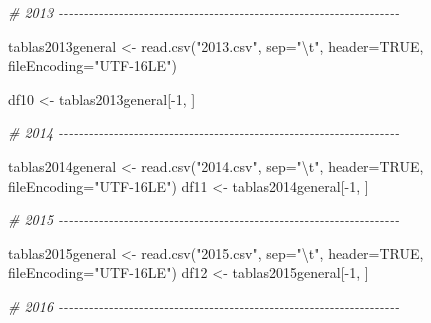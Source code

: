 \documentclass[
]{article}
\newenvironment{Shaded}{\begin{snugshade}}{\end{snugshade}}
\newcommand{\AttributeTok}[1]{\textcolor[rgb]{0.77,0.63,0.00}{#1}}
\newcommand{\CommentTok}[1]{\textcolor[rgb]{0.56,0.35,0.01}{\textit{#1}}}
\newcommand{\ConstantTok}[1]{\textcolor[rgb]{0.00,0.00,0.00}{#1}}
\newcommand{\DecValTok}[1]{\textcolor[rgb]{0.00,0.00,0.81}{#1}}
\newcommand{\FunctionTok}[1]{\textcolor[rgb]{0.00,0.00,0.00}{#1}}
\newcommand{\NormalTok}[1]{#1}
\newcommand{\OtherTok}[1]{\textcolor[rgb]{0.56,0.35,0.01}{#1}}
\newcommand{\SpecialCharTok}[1]{\textcolor[rgb]{0.00,0.00,0.00}{#1}}
\newcommand{\StringTok}[1]{\textcolor[rgb]{0.31,0.60,0.02}{#1}}
\begin{document}
\begin{Shaded}
\begin{Highlighting}[]
\CommentTok{\# 2013 {-}{-}{-}{-}{-}{-}{-}{-}{-}{-}{-}{-}{-}{-}{-}{-}{-}{-}{-}{-}{-}{-}{-}{-}{-}{-}{-}{-}{-}{-}{-}{-}{-}{-}{-}{-}{-}{-}{-}{-}{-}{-}{-}{-}{-}{-}{-}{-}{-}{-}{-}{-}{-}{-}{-}{-}{-}{-}{-}{-}{-}{-}{-}{-}{-}{-}{-}{-}}

\NormalTok{tablas2013general }\OtherTok{\textless{}{-}} \FunctionTok{read.csv}\NormalTok{(}\StringTok{"2013.csv"}\NormalTok{, }\AttributeTok{sep=}\StringTok{"}\SpecialCharTok{\textbackslash{}t}\StringTok{"}\NormalTok{, }\AttributeTok{header=}\ConstantTok{TRUE}\NormalTok{, }\AttributeTok{fileEncoding=}\StringTok{"UTF{-}16LE"}\NormalTok{)}

\NormalTok{df10 }\OtherTok{\textless{}{-}}\NormalTok{ tablas2013general[}\SpecialCharTok{{-}}\DecValTok{1}\NormalTok{, ]}


\CommentTok{\# 2014 {-}{-}{-}{-}{-}{-}{-}{-}{-}{-}{-}{-}{-}{-}{-}{-}{-}{-}{-}{-}{-}{-}{-}{-}{-}{-}{-}{-}{-}{-}{-}{-}{-}{-}{-}{-}{-}{-}{-}{-}{-}{-}{-}{-}{-}{-}{-}{-}{-}{-}{-}{-}{-}{-}{-}{-}{-}{-}{-}{-}{-}{-}{-}{-}{-}{-}{-}{-}}

\NormalTok{tablas2014general }\OtherTok{\textless{}{-}} \FunctionTok{read.csv}\NormalTok{(}\StringTok{"2014.csv"}\NormalTok{, }\AttributeTok{sep=}\StringTok{"}\SpecialCharTok{\textbackslash{}t}\StringTok{"}\NormalTok{, }\AttributeTok{header=}\ConstantTok{TRUE}\NormalTok{, }\AttributeTok{fileEncoding=}\StringTok{"UTF{-}16LE"}\NormalTok{)}
\NormalTok{df11 }\OtherTok{\textless{}{-}}\NormalTok{ tablas2014general[}\SpecialCharTok{{-}}\DecValTok{1}\NormalTok{, ]}


\CommentTok{\# 2015 {-}{-}{-}{-}{-}{-}{-}{-}{-}{-}{-}{-}{-}{-}{-}{-}{-}{-}{-}{-}{-}{-}{-}{-}{-}{-}{-}{-}{-}{-}{-}{-}{-}{-}{-}{-}{-}{-}{-}{-}{-}{-}{-}{-}{-}{-}{-}{-}{-}{-}{-}{-}{-}{-}{-}{-}{-}{-}{-}{-}{-}{-}{-}{-}{-}{-}{-}{-}}

\NormalTok{tablas2015general }\OtherTok{\textless{}{-}} \FunctionTok{read.csv}\NormalTok{(}\StringTok{"2015.csv"}\NormalTok{, }\AttributeTok{sep=}\StringTok{"}\SpecialCharTok{\textbackslash{}t}\StringTok{"}\NormalTok{, }\AttributeTok{header=}\ConstantTok{TRUE}\NormalTok{, }\AttributeTok{fileEncoding=}\StringTok{"UTF{-}16LE"}\NormalTok{)}
\NormalTok{df12 }\OtherTok{\textless{}{-}}\NormalTok{ tablas2015general[}\SpecialCharTok{{-}}\DecValTok{1}\NormalTok{, ]}


\CommentTok{\# 2016 {-}{-}{-}{-}{-}{-}{-}{-}{-}{-}{-}{-}{-}{-}{-}{-}{-}{-}{-}{-}{-}{-}{-}{-}{-}{-}{-}{-}{-}{-}{-}{-}{-}{-}{-}{-}{-}{-}{-}{-}{-}{-}{-}{-}{-}{-}{-}{-}{-}{-}{-}{-}{-}{-}{-}{-}{-}{-}{-}{-}{-}{-}{-}{-}{-}{-}{-}{-}}


\end{Highlighting}
\end{Shaded}
\end{document}
